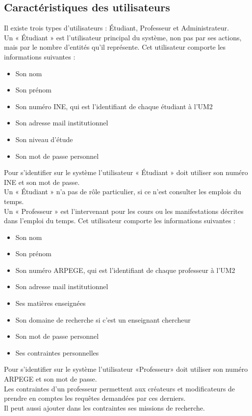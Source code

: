 \documentclass[a4paper, 11pt]{article}
\begin{document}
        \subsection{ Caractéristiques des utilisateurs}
        Il existe trois types d'utilisateurs : Étudiant, Professeur et Administrateur.\\Un « Étudiant » est l'utilisateur principal du système, non pas par ses actions, mais par le nombre d'entités qu'il représente. Cet utilisateur comporte les informations suivantes :
        \begin{itemize}
        \item Son nom
        \item Son prénom
        \item Son numéro INE, qui est l'identifiant de chaque étudiant à l'UM2
        \item Son adresse mail institutionnel
        \item Son niveau d'étude
        \item Son mot de passe personnel
        \end{itemize}
Pour s'identifier sur le système l'utilisateur « Étudiant » doit utiliser son numéro INE et son mot de passe.\\Un « Étudiant » n'a pas de rôle particulier, si ce n'est consulter les emplois du temps.
\\Un « Professeur » est l'intervenant pour les cours ou les manifestations décrites dans l'emploi du temps. Cet utilisateur comporte les informations suivantes :
        \begin{itemize}
        \item Son nom
        \item Son prénom
        \item Son numéro ARPEGE, qui est l'identifiant de chaque professeur à l'UM2
        \item Son adresse mail institutionnel
        \item Ses matières enseignées
        \item Son domaine de recherche si c'est un enseignant chercheur
        \item Son mot de passe personnel
        \item Ses contraintes personnelles
        \end{itemize}
Pour s'identifier sur le système l'utilisateur «Professeur» doit utiliser son numéro ARPEGE et son mot de passe.\\Les contraintes d'un professeur permettent aux créateurs et modificateurs de prendre en comptes les requêtes demandées par ces derniers.\\Il peut aussi ajouter dans les contraintes ses missions de recherche.
\end{document}
